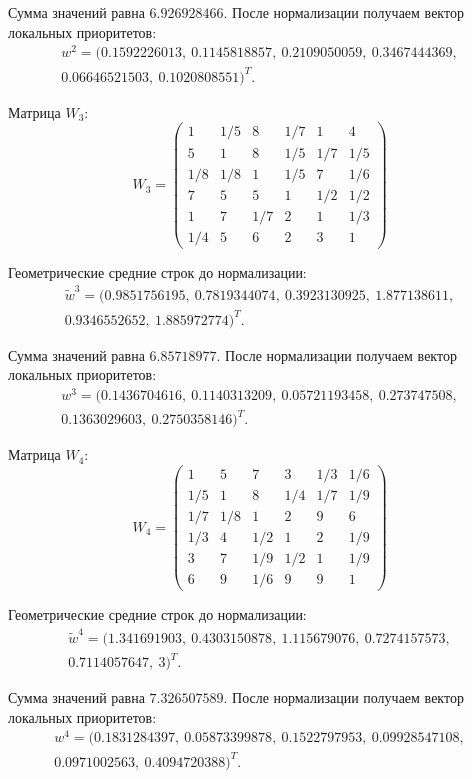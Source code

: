 Сумма значений равна $6.926928466$. После нормализации получаем вектор локальных приоритетов:
\begin{gather*}
w^2 = (0.1592226013,\ 0.1145818857,\ 0.2109050059,\ 0.3467444369,\\ 0.06646521503,\ 0.1020808551)^T.
\end{gather*}


Матрица $W_3$:
\[
W_3 = \begin{pmatrix}
1 & 1/5 & 8 & 1/7 & 1 & 4 \\
5 & 1 & 8 & 1/5 & 1/7 & 1/5 \\
1/8 & 1/8 & 1 & 1/5 & 7 & 1/6 \\
7 & 5 & 5 & 1 & 1/2 & 1/2 \\
1 & 7 & 1/7 & 2 & 1 & 1/3 \\
1/4 & 5 & 6 & 2 & 3 & 1
\end{pmatrix}
\]

Геометрические средние строк до нормализации:
\begin{gather*}
\tilde{w}^3 = (0.9851756195,\ 0.7819344074,\ 0.3923130925,\ 1.877138611,\\ 0.9346552652,\ 1.885972774)^T.
\end{gather*}

Сумма значений равна $6.85718977$. После нормализации получаем вектор локальных приоритетов:
\begin{gather*}
w^3 = (0.1436704616,\ 0.1140313209,\ 0.05721193458,\ 0.273747508,\\ 0.1363029603,\ 0.2750358146)^T.
\end{gather*}


Матрица $W_4$:
\[
W_4 = \begin{pmatrix}
1 & 5 & 7 & 3 & 1/3 & 1/6 \\
1/5 & 1 & 8 & 1/4 & 1/7 & 1/9 \\
1/7 & 1/8 & 1 & 2 & 9 & 6 \\
1/3 & 4 & 1/2 & 1 & 2 & 1/9 \\
3 & 7 & 1/9 & 1/2 & 1 & 1/9 \\
6 & 9 & 1/6 & 9 & 9 & 1
\end{pmatrix}
\]

Геометрические средние строк до нормализации:
\begin{gather*}
\tilde{w}^4 = (1.341691903,\ 0.4303150878,\ 1.115679076,\ 0.7274157573,\\ 0.7114057647,\ 3)^T.
\end{gather*}

Сумма значений равна $7.326507589$. После нормализации получаем вектор локальных приоритетов:
\begin{gather*}
w^4 = (0.1831284397,\ 0.05873399878,\ 0.1522797953,\ 0.09928547108,\\ 0.0971002563,\ 0.4094720388)^T.
\end{gather*}


